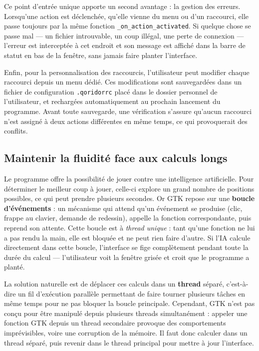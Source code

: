 \documentclass[a4paper]{article}
\begin{document}
Ce point d'entrée unique apporte un second avantage : la gestion des
erreurs. Lorsqu'une action est déclenchée, qu'elle vienne du menu ou
d'un raccourci, elle passe toujours par la même fonction
\texttt{\_on\_action\_activated}. Si quelque chose se passe mal —
un fichier introuvable, un coup illégal, une perte de connexion —
l'erreur est interceptée à cet endroit et son message est affiché
dans la barre de statut en bas de la fenêtre, sans jamais faire
planter l'interface.

Enfin, pour la personnalisation des raccourcis, l'utilisateur peut
modifier chaque raccourci depuis un menu dédié. Ces modifications sont
sauvegardées dans un fichier de configuration \texttt{.qoridorrc}
placé dans le dossier personnel de l'utilisateur, et rechargées
automatiquement au prochain lancement du programme. Avant toute
sauvegarde, une vérification s'assure qu'aucun raccourci n'est
assigné à deux actions différentes en même temps, ce qui provoquerait
des conflits.

\subsection{Maintenir la fluidité face aux calculs longs}

Le programme offre la possibilité de jouer contre une intelligence
artificielle. Pour déterminer le meilleur coup à jouer, celle-ci
explore un grand nombre de positions possibles, ce qui peut prendre
plusieurs secondes. Or GTK repose sur une \textbf{boucle d'événements} :
un mécanisme qui attend qu'un événement se produise (clic, frappe au
clavier, demande de redessin), appelle la fonction correspondante,
puis reprend son attente. Cette boucle est à \emph{thread unique} :
tant qu'une fonction ne lui a pas rendu la main, elle est bloquée et
ne peut rien faire d'autre. Si l'IA calcule directement dans cette
boucle, l'interface se fige complètement pendant toute la durée du
calcul — l'utilisateur voit la fenêtre grisée et croit que le
programme a planté.

La solution naturelle est de déplacer ces calculs dans un \textbf{thread} séparé, c'est-à-dire un fil d'exécution parallèle permettant de faire tourner plusieurs tâches en même temps pour ne pas bloquer la boucle principale. Cependant, GTK n'est pas conçu pour
être manipulé depuis plusieurs threads simultanément : appeler une
fonction GTK depuis un thread secondaire provoque des comportements
imprévisibles, voire une corruption de la mémoire. Il faut donc
calculer dans un thread séparé, puis revenir dans le thread principal
pour mettre à jour l'interface.
\end{document}
